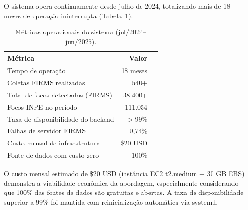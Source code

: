 O sistema opera continuamente desde julho de 2024, totalizando mais de 18 meses de operação ininterrupta (Tabela~\ref{tab:operational}).

\begin{table}[htbp]
\centering
\caption{Métricas operacionais do sistema (jul/2024--jun/2026).}
\label{tab:operational}
\small
\begin{tabular}{@{}lrr@{}}
\toprule
\textbf{Métrica} & \textbf{Valor} \\ 
\midrule
Tempo de operação & 18 meses \\ 
Coletas FIRMS realizadas & 540+ \\ 
Total de focos detectados (FIRMS) & 38.400+ \\ 
Focos INPE no período & 111.054 \\ 
Taxa de disponibilidade do backend & $>$99\% \\ 
Falhas de servidor FIRMS & 0,74\% \\ 
Custo mensal de infraestrutura & \$20 USD \\ 
Fonte de dados com custo zero & 100\% \\ 
\bottomrule
\end{tabular}
\end{table}

O custo mensal estimado de \$20 USD (instância EC2 t2.medium + 30 GB EBS) demonstra a viabilidade econômica da abordagem, especialmente considerando que 100\% das fontes de dados são gratuitas e abertas. A taxa de disponibilidade superior a 99\% foi mantida com reinicialização automática via systemd.

\endinput

